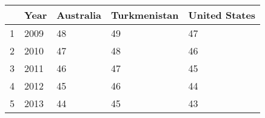 \begin{tabular}{lllll}
\toprule
 & Year  & Australia  & Turkmenistan  & United States  \\
\midrule
1 & 2009  & 48  & 49  & 47  \\
2 & 2010  & 47  & 48  & 46  \\
3 & 2011  & 46  & 47  & 45  \\
4 & 2012  & 45  & 46  & 44  \\
5 & 2013  & 44  & 45  & 43  \\
\bottomrule
\end{tabular}
